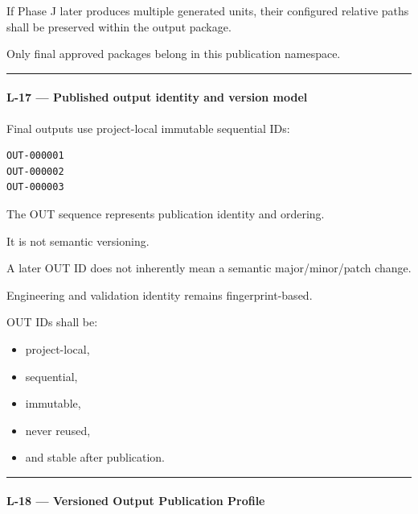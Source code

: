 If Phase J later produces multiple generated units, their configured relative paths shall be preserved within the output package.

Only final approved packages belong in this publication namespace.

\begin{center}\rule{0.5\linewidth}{0.5pt}\end{center}

\hypertarget{l-17--published-output-identity-and-version-model}{%
\paragraph{L-17 --- Published output identity and version model}\label{l-17--published-output-identity-and-version-model}}

Final outputs use project-local immutable sequential IDs:

\begin{verbatim}
OUT-000001
OUT-000002
OUT-000003
\end{verbatim}

The OUT sequence represents publication identity and ordering.

It is not semantic versioning.

A later OUT ID does not inherently mean a semantic major/minor/patch change.

Engineering and validation identity remains fingerprint-based.

OUT IDs shall be:

\begin{itemize}
\tightlist
\item
  project-local,
\item
  sequential,
\item
  immutable,
\item
  never reused,
\item
  and stable after publication.
\end{itemize}

\begin{center}\rule{0.5\linewidth}{0.5pt}\end{center}

\hypertarget{l-18--versioned-output-publication-profile}{%
\paragraph{L-18 --- Versioned Output Publication Profile}\label{l-18--versioned-output-publication-profile}}

